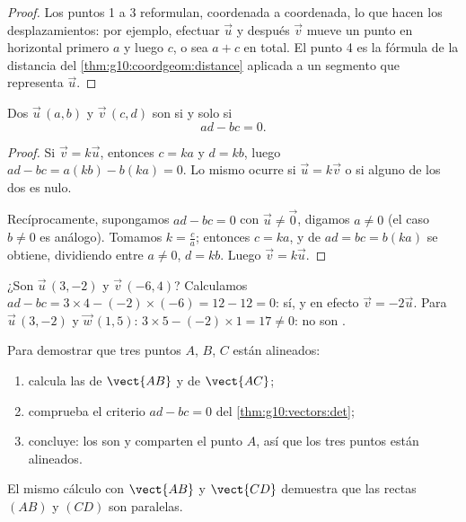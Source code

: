 \begin{proof}
Los puntos 1 a 3 reformulan, coordenada a coordenada, lo que hacen los
desplazamientos: por ejemplo, efectuar $\vec u$ y después $\vec v$ mueve
un punto en horizontal primero $a$ y luego $c$, o sea $a + c$ en total. El
punto 4 es la fórmula de la distancia del
\cref{thm:g10:coordgeom:distance} aplicada a un segmento que representa
$\vec u$.
\end{proof}

\begin{theorem}\label{thm:g10:vectors:det}
Dos  $\vec u\,(a, b)$ y $\vec v\,(c, d)$ son  si y solo
si
\[
ad - bc = 0 .
\]
\end{theorem}

\begin{proof}
Si $\vec v = k\vec u$, entonces $c = ka$ y $d = kb$, luego
$ad - bc = a(kb) - b(ka) = 0$. Lo mismo ocurre si $\vec u = k \vec v$ o si
alguno de los dos  es nulo.

Recíprocamente, supongamos $ad - bc = 0$ con $\vec u \neq \vec 0$,
digamos $a \neq 0$ (el caso $b \neq 0$ es análogo). Tomamos
$k = \frac{c}{a}$; entonces $c = ka$, y de $ad = bc = b(ka)$ se obtiene,
dividiendo entre $a \neq 0$, $d = kb$. Luego $\vec v = k\vec u$.
\end{proof}

\begin{example}\label{ex:g10:vectors:det}
¿Son  $\vec u\,(3, -2)$ y $\vec v\,(-6, 4)$? Calculamos
$ad - bc = 3 \times 4 - (-2)\times(-6) = 12 - 12 = 0$: sí, y en efecto
$\vec v = -2\vec u$. Para $\vec u\,(3, -2)$ y $\vec w\,(1, 5)$:
$3 \times 5 - (-2) \times 1 = 17 \neq 0$: no son .
\end{example}

\begin{method}\label{met:g10:vectors:alignment}
Para demostrar que tres puntos $A$, $B$, $C$ están alineados:
\begin{enumerate}
  \item calcula las  de $\vect{AB}$ y de $\vect{AC}$;
  \item comprueba el criterio $ad - bc = 0$ del
        \cref{thm:g10:vectors:det};
  \item concluye: los  son  y comparten el punto $A$,
        así que los tres puntos están alineados.
\end{enumerate}
El mismo cálculo con $\vect{AB}$ y $\vect{CD}$ demuestra que las rectas
$(AB)$ y $(CD)$ son paralelas.
\end{method}

